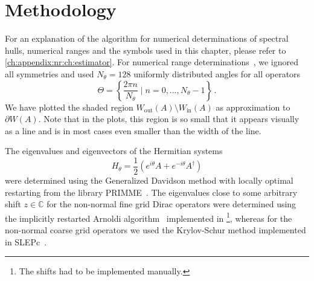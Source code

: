 








\section{Methodology}
\label{sec:chirality:methods}

For an explanation of the algorithm for numerical determinations of spectral hulls, numerical ranges and the symbols used in this chapter, please refer to \cref{ch:appendix:nr:ch:estimator}.
For numerical range determinations~\cite{johnson1978numerical}, we ignored all symmetries and used $N_{\theta}=128$ uniformly distributed angles for all operators
\begin{equation}
\Theta = \left\{ \frac{2 \pi n}{N_{\theta}} \mid n = 0, \ldots, N_{\theta}-1 \right\} \,.
\end{equation}
We have plotted the shaded region $W_{\text{out}}(A) \setminus W_{\text{in}}(A)$ as approximation to $\partial W(A)$.
Note that in the plots, this region is so small that it appears visually as a line and is in most cases even smaller than the width of the line.

The eigenvalues and eigenvectors of the Hermitian systems
\begin{equation}
H_{\theta} = \frac{1}{2} \left(e^{i \theta} A + e^{-i \theta} A^{\dagger} \right)
\end{equation}
were determined using the Generalized Davidson method with locally optimal restarting from the library PRIMME~\cite{primme}.
The eigenvalues close to some arbitrary shift $z \in \mathbb{C}$ for the non-normal fine grid Dirac operators were determined using the implicitly restarted Arnoldi algorithm~\cite{doi:10.1137/S0895479899358595} implemented in \quda\footnote{The shifts had to be implemented manually.}, whereas for the non-normal coarse grid operators we used the Krylov-Schur method implemented in SLEPc~\cite{slepc}.

